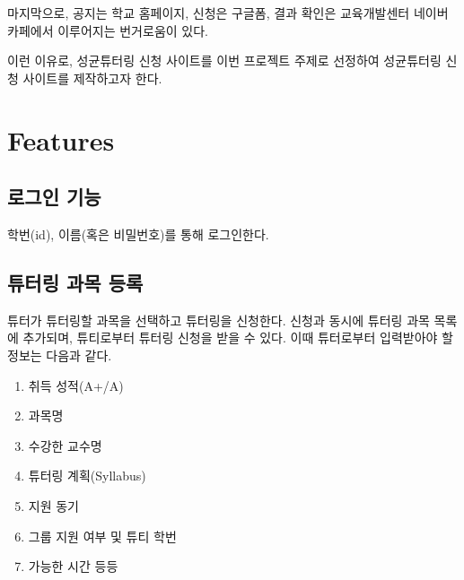 \documentclass{lxaiproposal}
\begin{document}
마지막으로, 공지는 학교 홈페이지, 신청은 구글폼, 결과 확인은 교육개발센터 네이버 카페에서 이루어지는 번거로움이 있다.

이런 이유로, 성균튜터링 신청 사이트를 이번 프로젝트 주제로 선정하여 성균튜터링 신청 사이트를 제작하고자 한다.







\section{Features}

\subsection{로그인 기능}
학번(id), 이름(혹은 비밀번호)를 통해 로그인한다.

\subsection{튜터링 과목 등록}
튜터가 튜터링할 과목을 선택하고 튜터링을 신청한다. 신청과 동시에 튜터링 과목 목록에 추가되며, 튜티로부터 튜터링 신청을 받을 수 있다.
이때 튜터로부터 입력받아야 할 정보는 다음과 같다.
\begin{enumerate}
    \item 취득 성적(A+/A)
    \item 과목명
    \item 수강한 교수명
    \item 튜터링 계획(Syllabus)
    \item 지원 동기
    \item 그룹 지원 여부 및 튜티 학번
    \item 가능한 시간 등등
\end{enumerate}
\end{document}

